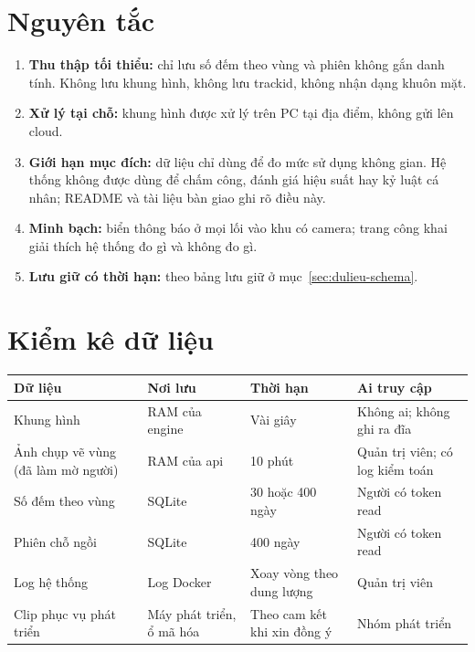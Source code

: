 \documentclass[10pt,a4paper,oneside,openany]{report}
\newcommand{\breakus}{\textunderscore\allowbreak}
\newcommand{\code}[1]{{\ttfamily\let\_\breakus #1}}
\newcommand{\tabhead}[1]{\textsf{\bfseries\color{ink}#1}}
\newenvironment{bang}{\par\small\rowcolors{2}{rowgray}{white}}{\par\vspace{0.3em}}
\begin{document}
\section{Nguyên tắc}
\begin{enumerate}
  \item \textbf{Thu thập tối thiểu:} chỉ lưu số đếm theo vùng và phiên không gắn danh tính. Không lưu khung hình, không lưu \code{track\_id}, không nhận dạng khuôn mặt.
  \item \textbf{Xử lý tại chỗ:} khung hình được xử lý trên PC tại địa điểm, không gửi lên cloud.
  \item \textbf{Giới hạn mục đích:} dữ liệu chỉ dùng để đo mức sử dụng không gian. Hệ thống không được dùng để chấm công, đánh giá hiệu suất
        hay kỷ luật cá nhân; README và tài liệu bàn giao ghi rõ điều này.
  \item \textbf{Minh bạch:} biển thông báo ở mọi lối vào khu có camera; trang công khai giải thích hệ thống đo gì và không đo gì.
  \item \textbf{Lưu giữ có thời hạn:} theo bảng lưu giữ ở mục~\ref{sec:dulieu-schema}.
\end{enumerate}

\section{Kiểm kê dữ liệu}
\begin{bang}
\begin{xltabular}{\linewidth}{L{34mm}L{30mm}L{26mm}Y}
\toprule
\tabhead{Dữ liệu} & \tabhead{Nơi lưu} & \tabhead{Thời hạn} & \tabhead{Ai truy cập} \\
\midrule
\endhead
Khung hình & RAM của engine & Vài giây & Không ai; không ghi ra đĩa \\
Ảnh chụp vẽ vùng (đã làm mờ người) & RAM của api & 10 phút & Quản trị viên; có log kiểm toán \\
Số đếm theo vùng & SQLite & 30 hoặc 400 ngày & Người có token \code{read} \\
Phiên chỗ ngồi & SQLite & 400 ngày & Người có token \code{read} \\
Log hệ thống & Log Docker & Xoay vòng theo dung lượng & Quản trị viên \\
Clip phục vụ phát triển & Máy phát triển, ổ mã hóa & Theo cam kết khi xin đồng ý & Nhóm phát triển \\
\bottomrule
\end{xltabular}
\end{bang}
\end{document}
